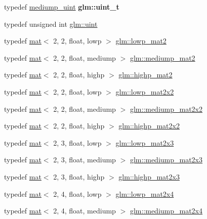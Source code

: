 \begin{DoxyCompactItemize}
typedef \hyperlink{group__core__precision_ga08ae38ad78ade3539fdd1d25052b8c51}{mediump\+\_\+uint} {\bfseries glm\+::uint\+\_\+t}
\item 
typedef unsigned int \hyperlink{group__core__precision_ga4fd29415871152bfb5abd588334147c8}{glm\+::uint}
\item 
typedef \hyperlink{structglm_1_1mat}{mat}$<$ 2, 2, float, lowp $>$ \hyperlink{group__core__precision_ga786e43e2a310fa4bddba3e41b786aa82}{glm\+::lowp\+\_\+mat2}
\item 
typedef \hyperlink{structglm_1_1mat}{mat}$<$ 2, 2, float, mediump $>$ \hyperlink{group__core__precision_ga698131fdb127cb55e8b70cc1b2c4ff67}{glm\+::mediump\+\_\+mat2}
\item 
typedef \hyperlink{structglm_1_1mat}{mat}$<$ 2, 2, float, highp $>$ \hyperlink{group__core__precision_gae7066dac53a008363d6faeabf46ccb03}{glm\+::highp\+\_\+mat2}
\item 
typedef \hyperlink{structglm_1_1mat}{mat}$<$ 2, 2, float, lowp $>$ \hyperlink{group__core__precision_gaab9064a0fd0e3ac8d4ae8ceb2dc4fe56}{glm\+::lowp\+\_\+mat2x2}
\item 
typedef \hyperlink{structglm_1_1mat}{mat}$<$ 2, 2, float, mediump $>$ \hyperlink{group__core__precision_gaa7581ec892b01e6ba19c4fdbc7c60df4}{glm\+::mediump\+\_\+mat2x2}
\item 
typedef \hyperlink{structglm_1_1mat}{mat}$<$ 2, 2, float, highp $>$ \hyperlink{group__core__precision_gacdb012ddb9e783ed51b0ee009bf0d822}{glm\+::highp\+\_\+mat2x2}
\item 
typedef \hyperlink{structglm_1_1mat}{mat}$<$ 2, 3, float, lowp $>$ \hyperlink{group__core__precision_gafb73af64c7fb56c398efec50b5cb5108}{glm\+::lowp\+\_\+mat2x3}
\item 
typedef \hyperlink{structglm_1_1mat}{mat}$<$ 2, 3, float, mediump $>$ \hyperlink{group__core__precision_gae5003c3cea9aa152bf452223b7fd0fd5}{glm\+::mediump\+\_\+mat2x3}
\item 
typedef \hyperlink{structglm_1_1mat}{mat}$<$ 2, 3, float, highp $>$ \hyperlink{group__core__precision_ga9d61903aea75d6932829cd049f2e622a}{glm\+::highp\+\_\+mat2x3}
\item 
typedef \hyperlink{structglm_1_1mat}{mat}$<$ 2, 4, float, lowp $>$ \hyperlink{group__core__precision_ga674d889016f44d1084ec467c73df8434}{glm\+::lowp\+\_\+mat2x4}
\item 
typedef \hyperlink{structglm_1_1mat}{mat}$<$ 2, 4, float, mediump $>$ \hyperlink{group__core__precision_ga9778942a37cd364cc4129cbf423df429}{glm\+::mediump\+\_\+mat2x4}

\end{DoxyCompactItemize}
